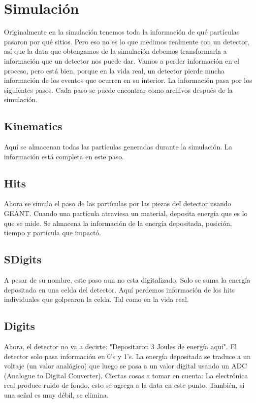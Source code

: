 \documentclass{article}
\begin{document}
\newpage
\section{Simulaci\'on}

Originalmente en la simulaci\'on tenemos toda la informaci\'on de qu\'e part\'iculas pasaron por qu\'e sitios. Pero eso no es lo que medimos realmente con un detector, as\'i que la data que obtengamos de la simulaci\'on debemos transformarla a informaci\'on que un detector nos puede dar. Vamos a perder informaci\'on en el proceso, pero est\'a bien, porque en la vida real, un detector pierde mucha informaci\'on de los eventos que ocurren en su interior. La informaci\'on pasa por los siguientes pasos. Cada paso se puede encontrar como archivos despu\'es de la simulaci\'on.

\subsection{Kinematics}

Aqu\'i se almacenan todas las part\'iculas generadas durante la simulaci\'on. La informaci\'on est\'a completa en este paso.

\subsection{Hits}

Ahora se simula el paso de las part\'iculas por las piezas del detector usando GEANT. Cuando una part\'icula atraviesa un material, deposita energ\'ia que es lo que se mide. Se almacena la informaci\'on de la energ\'ia depositada, posici\'on, tiempo y part\'icula que impact\'o.

\subsection{SDigits}

A pesar de su nombre, este paso aun no esta digitalizado. Solo se suma la energ\'ia depositada en una celda del detector. Aqu\'i perdemos informaci\'on de los hits individuales que golpearon la celda. Tal como en la vida real.

\subsection{Digits}

Ahora, el detector no va a decirte: "Depositaron 3 Joules de energ\'ia aqu\'i". El detector solo pasa informaci\'on en 0's y 1's. La energ\'ia depositada se traduce a un voltaje (un valor anal\'ogico) que luego se pasa a un valor digital usando un ADC (Analogue to Digital Converter). Ciertas cosas a tomar en cuenta: La electr\'onica real produce ruido de fondo, esto se agrega a la data en este punto. Tambi\'en, si una señal es muy d\'ebil, se elimina.
\end{document}
